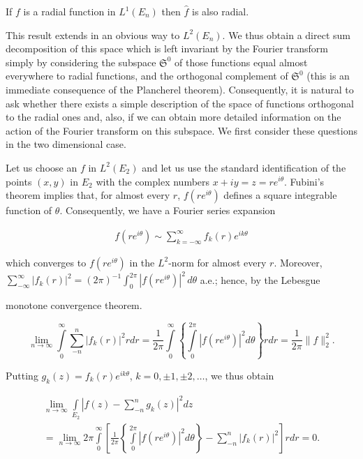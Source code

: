 \begin{corollary}
\label{cor:c4-1-2}
If $f$ is a radial function in $L^{1}(E_{n})$ then $\hat{f}$ is also radial.
\end{corollary}

This result extends in an obvious way to $L^2(E_n)$. We thus obtain a direct sum decomposition of this space which is left invariant by the Fourier transform simply by considering the subspace $\mathfrak{S}^0$ of those functions equal almost everywhere to radial functions, and the orthogonal complement of $\mathfrak{S}^0$ (this is an immediate consequence of the Plancherel theorem). Consequently, it is natural to ask whether there exists a simple description of the space of functions orthogonal to the radial ones and, also, if we can obtain more detailed information on the action of the Fourier transform on this subspace. We first consider these questions in the two dimensional case.

Let us choose an $f$ in $L^2(E_2)$ and let us use the standard identification of the points $(x, y)$ in $E_2$ with the complex numbers $x + iy = z = re^{i\theta}$. Fubini's theorem implies that, for almost every $r$, $f(re^{i\theta})$ defines a square integrable function of $\theta$. Consequently, we have a Fourier series expansion

\begin{equation}\label{eq:c4-1-3}
\begin{array}{c} f(re^{i\theta}) \sim \displaystyle \sum_{k = - \infty}^{\infty} f_{k}(r)e^{ik\theta} \end{array}
\end{equation}

which converges to $f(re^{i\theta})$ in the $L^2$-norm for almost every $r$. Moreover, $\sum_{-\infty}^{\infty}|f_k(r)|^2 = (2\pi)^{-1}\int_0^{2\pi}|f(re^{i\theta})|^2\,d\theta$ a.e.; hence, by the Lebesgue

monotone convergence theorem.

\[
\lim_{n\to\infty}\int\limits_{0}^{\infty}\sum_{-n}^{n}|f_{k}(r)|^{2}r dr=\frac{1}{2\pi}\int\limits_{0}^{\infty}\left\{\int\limits_{0}^{2\pi}|f(re^{i\theta})|^{2}d\theta\right\}r dr=\frac{1}{2\pi}\|f\|_{2}^{2}.
\]

Putting $g_k(z) = f_k(r)e^{ik\theta}$, $k = 0, \pm1, \pm2, \ldots$, we thus obtain

\[
\begin{aligned}\lim_{n\to\infty}\int\limits_{E_{2}}|f(z)-\sum_{-n}^{n}g_{k}(z)|^{2}dz\\=\lim_{n\to\infty}2\pi\int\limits_{0}^{\infty}\left[\frac{1}{2\pi}\left\{\int\limits_{0}^{2\pi}|f(re^{i\theta})|^{2}d\theta\right\}-\sum_{-n}^{n}|f_{k}(r)|^{2}\right]r dr=0.\end{aligned}
\]

